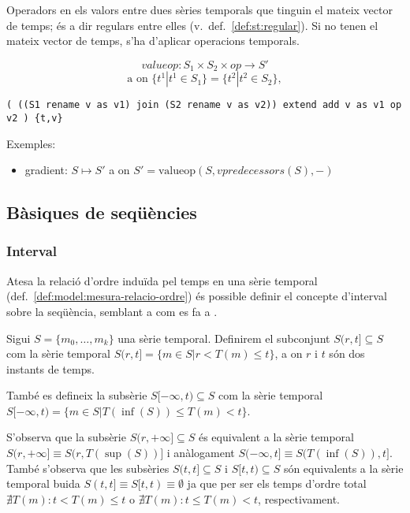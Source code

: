 Operadors en els valors entre dues sèries temporals que tinguin el
mateix vector de temps; és a dir regulars entre elles
(v.\ def.~\ref{def:st:regular}). Si no tenen el mateix vector de temps, s'ha
d'aplicar operacions temporals. 

\[
valueop: S_1 \times S_2 \times op \longrightarrow S'
\]
\[
\text{a on } \{t^1|t^1\in S_1\} = \{t^2|t^2\in S_2\}, 
\]

\begin{verbatim} 
( ((S1 rename v as v1) join (S2 rename v as v2)) extend add v as v1 op v2 ) {t,v}
\end{verbatim}



Exemples:
\begin{itemize}
\item gradient: $S \mapsto S'$ a on $S'= \text{valueop}(S,vpredecessors(S),-)$
\end{itemize}




\subsection{Bàsiques de seqüències}






\subsubsection{Interval}

Atesa la relació d'ordre induïda pel temps en una sèrie temporal
(def.\ \ref{def:model:mesura-relacio-ordre}) és possible definir el
concepte d'interval sobre la seqüència, semblant a com es fa a
\cite{last:keogh,last:hetland}.


\begin{definition}[Interval]
  \label{def:model:st-interval}
  Sigui $S=\{m_0, \ldots, m_k\}$ una sèrie temporal. Definirem el subconjunt
  $S(r,t] \subseteq S$ com la sèrie temporal $S(r,t]=\{m\in S
  | r<T(m)\leq t\}$, a on $r$ i $t$ són dos instants de temps.

  També es defineix la subsèrie $S[-\infty,t)\subseteq S$ com la sèrie
  temporal $S[-\infty,t) = \{m\in S | T(\inf(S))\leq T(m) < t\}$.
\end{definition}
S'observa que la subsèrie $S(r,+\infty]\subseteq S$ és
equivalent a la sèrie temporal $S(r,+\infty] \equiv S(r,T(\sup(S))]$ i
anàlogament $S(-\infty,t] \equiv S(T(\inf(S)),t]$. També s'observa que les subsèries $S(t,t]\subseteq S$ i $S[t,t)\subseteq S$ són equivalents a la sèrie temporal buida $S(t,t] \equiv S[t,t) \equiv \emptyset$ ja que per ser els temps d'ordre total $\nexists T(m): t < T(m) \leq t$ o $\nexists T(m): t \leq T(m) < t$, respectivament. 




